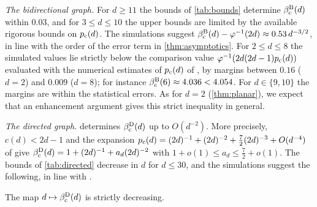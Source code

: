 \documentclass[11pt,letterpaper]{article}
\begin{document}
\emph{The bidirectional graph.} For $d\ge11$ the bounds of \cref{tab:bounds} determine $\beta_{\mathrm c}^{\mathrm B}(d)$ within $0.03$, and for $3\le d\le10$ the upper bounds are limited by the available rigorous bounds on $p_{\mathrm c}(d)$. The simulations suggest $\beta_{\mathrm c}^{\mathrm B}(d)-\varphi^{-1}(2d)\approx0.53\,d^{-3/2}$, in line with the order of the error term in \cref{thm:asymptotics}. For $2\le d\le8$ the simulated values lie strictly below the comparison value $\varphi^{-1}(2d(2d-1)p_{\mathrm c}(d))$ evaluated with the numerical estimates of $p_{\mathrm c}(d)$ of \cite{MM18}, by margins between $0.16$ ($d=2$) and $0.009$ ($d=8$); for instance $\beta_{\mathrm c}^{\mathrm B}(6)\approx4.036<4.054$. For $d\in\{9,10\}$ the margins are within the statistical errors. As for $d=2$ (\cref{thm:planar}), we expect that an enhancement argument gives this strict inequality in general.

\emph{The directed graph.}  determines $\beta_{\mathrm c}^{\mathrm D}(d)$ up to $O(d^{-2})$. More precisely, $c(d)<2d-1$ and the expansion $p_{\mathrm c}(d)=(2d)^{-1}+(2d)^{-2}+\frac72(2d)^{-3}+O(d^{-4})$ of \cite{HS95,vdHS06} give $\beta_{\mathrm c}^{\mathrm D}(d)=1+(2d)^{-1}+a_d(2d)^{-2}$ with $1+o(1)\le a_d\le\frac72+o(1)$.
The bounds of \cref{tab:directed} decrease in $d$ for $d\le30$, and the simulations suggest the following, in line with \cite[Conjecture~3.2]{JKLT25}.

\begin{conjecture}\label{conj:monotone}
The map $d\mapsto\beta_{\mathrm c}^{\mathrm D}(d)$ is strictly decreasing.
\end{conjecture}
\end{document}
